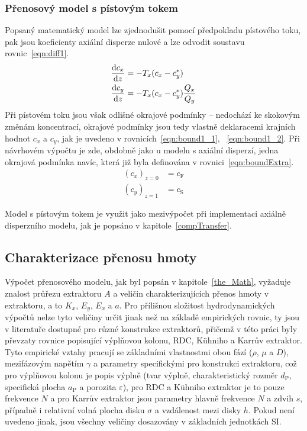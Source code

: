 \subsubsection{Přenosový model s pístovým tokem} \label{diff1}
Popsaný matematický model lze zjednodušit pomocí předpokladu pístového toku, pak jsou koeficienty axiální disperze nulové a lze odvodit soustavu rovnic~\ref{eqn:diff1}.
\begin{align}
\label{eqn:diff1}
	\frac{\mathrm{d} c_x}{\mathrm{d} z} &= -T_x (c_x - c_y^*)\\
	\frac{\mathrm{d} c_y}{\mathrm{d} z} &= -T_x (c_x - c_y^*) \frac{Q_x}{Q_y} \nonumber
\end{align}
Při pístovém toku jsou však odlišné okrajové podmínky -- nedochází ke skokovým změnám koncentrací, okrajové podmínky jsou tedy vlastně deklaracemi krajních hodnot $c_x$ a $c_y$, jak je uvedeno v rovnicích~\ref{eqn:bound1_1}, ~\ref{eqn:bound1_2}.
Při návrhovém výpočtu je zde, obdobně jako u modelu s axiální disperzí, jedna okrajová podmínka navíc, která již byla definována v rovnici~\ref{eqn:boundExtra}.
\begin{align}
\label{eqn:bound1_1}
	\left( c_x \right)_{z=0} &= c_\mathrm{F} \\
\label{eqn:bound1_2}
	\left( c_y \right)_{z=1} &= c_\mathrm{S}
\end{align}

Model s pístovým tokem je využit jako mezivýpočet při implementaci axiálně disperzního modelu, jak je popsáno v kapitole~\ref{compTransfer}.



\subsection{Charakterizace přenosu hmoty} \label{insfun}
Výpočet přenosového modelu, jak byl popsán v kapitole~\ref{the_Math}, vyžaduje znalost průřezu extraktoru $A$ a veličin charakterizujících přenos hmoty v extraktoru, a to $K_x$, $E_y$, $E_x$ a $a$.
Pro přílišnou složitost hydrodynamických výpočtů nelze tyto veličiny určit jinak než na základě empirických rovnic, ty jsou v literatuře dostupné pro různé konstrukce extraktorů, přičemž v této práci byly převzaty rovnice popisující výplňovou kolonu, RDC, Kühniho a Karrův extraktor.
Tyto empirické vztahy pracují se základními vlastnostmi obou fází ($\rho$, $\mu$ a $D$), mezifázovým napětím $\gamma$ a parametry specifickými pro konstrukci extraktoru, což pro výplňovou kolonu je popis výplně (tvar výplně, charakteristický rozměr $d_\mathrm{P}$, specifická plocha $a_\mathrm{P}$ a porozita $\varepsilon$), pro RDC a Kühniho extraktor je to pouze frekvence $N$ a pro Karrův extraktor jsou parametry hlavně frekvence $N$ a zdvih $s$, případně i relativní volná plocha disku $\sigma$ a vzdálenost mezi disky $h$.
Pokud není uvedeno jinak, jsou všechny veličiny dosazovány v základních jednotkách SI.

